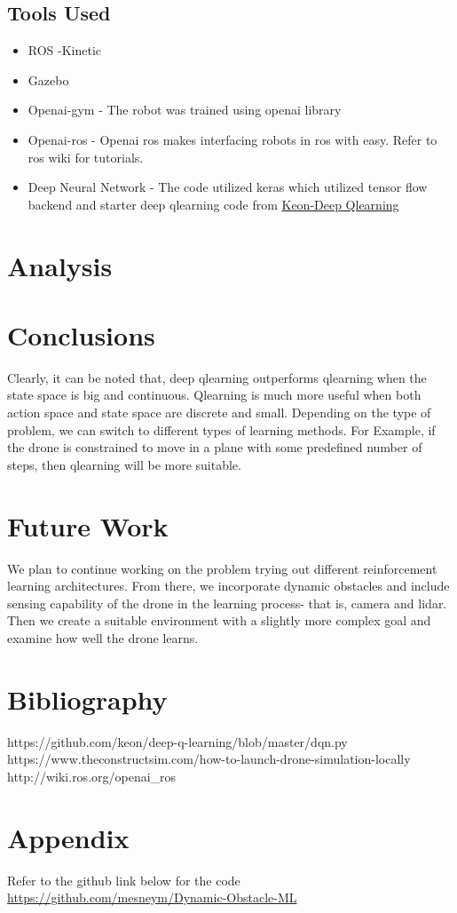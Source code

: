 \documentclass[12pt]{article}
\begin{document}
\subsection{Tools Used}
\begin{itemize}
  \item ROS -Kinetic
  \item Gazebo 
  \item Openai-gym - The robot was trained using openai library
  \item Openai-ros - Openai ros makes interfacing robots in ros with easy. Refer to ros wiki for tutorials. 
  \item Deep Neural Network - The code utilized keras which utilized tensor flow backend and starter deep qlearning code 
    from \href{https://github.com/keon/deep-q-learning/blob/master/dqn.py}{Keon-Deep Qlearning}
\end{itemize}
\section{Analysis}
\section{Conclusions}
Clearly, it can be noted that, deep qlearning outperforms qlearning when the state space is big and continuous. Qlearning is much more useful
when both action space and state space are discrete and small. Depending on the type of problem, we can switch to different types of learning
methods. For Example, if the drone is constrained to move in a plane with some predefined number of steps, then qlearning will be more suitable.

\section{Future Work}
We plan to continue working on the problem trying out different reinforcement learning architectures. From there, we incorporate 
dynamic obstacles and include sensing capability of the drone in the learning process- that is, camera and lidar. Then we create a suitable
environment with a slightly more complex goal and examine how well the drone learns.
\section{Bibliography}
https://github.com/keon/deep-q-learning/blob/master/dqn.py \\
https://www.theconstructsim.com/how-to-launch-drone-simulation-locally \\
http://wiki.ros.org/openai\_ros

\section{Appendix}
Refer to the github link below for the code \\
\href{https://github.com/mesneym/Dynamic-Obstacle-ML}{https://github.com/mesneym/Dynamic-Obstacle-ML}
\end{document}
